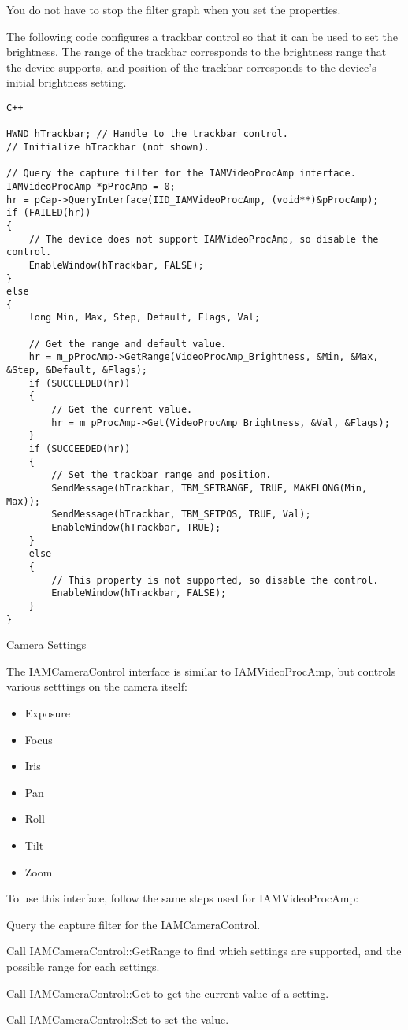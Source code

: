 You do not have to stop the filter graph when you set the properties.

The following code configures a trackbar control so that it can be used to set the brightness. The range of the trackbar corresponds to the brightness range that the device supports, and position of the trackbar corresponds to the device's initial brightness setting.

\begin{verbatim}
C++

HWND hTrackbar; // Handle to the trackbar control. 
// Initialize hTrackbar (not shown).

// Query the capture filter for the IAMVideoProcAmp interface.
IAMVideoProcAmp *pProcAmp = 0;
hr = pCap->QueryInterface(IID_IAMVideoProcAmp, (void**)&pProcAmp);
if (FAILED(hr))
{
    // The device does not support IAMVideoProcAmp, so disable the control.
    EnableWindow(hTrackbar, FALSE);
}
else
{
    long Min, Max, Step, Default, Flags, Val;
	
    // Get the range and default value. 
    hr = m_pProcAmp->GetRange(VideoProcAmp_Brightness, &Min, &Max, &Step, &Default, &Flags);
    if (SUCCEEDED(hr))
    {
        // Get the current value.
        hr = m_pProcAmp->Get(VideoProcAmp_Brightness, &Val, &Flags);
    }
    if (SUCCEEDED(hr))
    {
        // Set the trackbar range and position.
        SendMessage(hTrackbar, TBM_SETRANGE, TRUE, MAKELONG(Min, Max));
        SendMessage(hTrackbar, TBM_SETPOS, TRUE, Val);
        EnableWindow(hTrackbar, TRUE);
    }
    else
    {
        // This property is not supported, so disable the control.
        EnableWindow(hTrackbar, FALSE);
    }
}
\end{verbatim}

Camera Settings

The IAMCameraControl interface is similar to IAMVideoProcAmp, but controls various setttings on the camera itself:
\begin{itemize}
    \item Exposure
    \item Focus
    \item Iris
    \item Pan
    \item Roll
    \item Tilt
    \item Zoom
\end{itemize}
To use this interface, follow the same steps used for IAMVideoProcAmp:

Query the capture filter for the IAMCameraControl.

Call IAMCameraControl::GetRange to find which settings are supported, and the possible range for each settings.

Call IAMCameraControl::Get to get the current value of a setting.

Call IAMCameraControl::Set to set the value.

